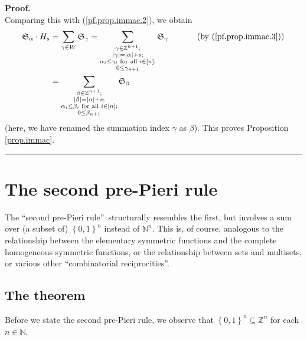 \documentclass[numbers=enddot,12pt,final,onecolumn,notitlepage,english]{scrartcl}%
\theoremstyle{definition}
\newenvironment{proof}[1][Proof]{\noindent\textbf{#1.} }{\ \rule{0.5em}{0.5em}}
\let\sumnonlimits\sum
\renewcommand{\sum}{\sumnonlimits\limits}
\newenvironment{verlong}{}{}
\begin{document}
\begin{proof}
\begin{verlong}
\[\]
Comparing this with (\ref{pf.prop.immac.2}), we obtain%
\begin{align*}
\mathfrak{S}_{\alpha}\cdot H_{s}  &  =\sum_{\gamma\in W}\mathfrak{S}_{\gamma
}=\sum_{\substack{\gamma\in\mathbb{Z}^{n+1};\\\left\vert \gamma\right\vert
=\left\vert \alpha\right\vert +s;\\\alpha_{i}\leq\gamma_{i}\text{ for all
}i\in\left[  n\right]  ;\\0\leq\gamma_{n+1}}}\mathfrak{S}_{\gamma
}\ \ \ \ \ \ \ \ \ \ \left(  \text{by (\ref{pf.prop.immac.3})}\right) \\
&  =\sum_{\substack{\beta\in\mathbb{Z}^{n+1};\\\left\vert \beta\right\vert
=\left\vert \alpha\right\vert +s;\\\alpha_{i}\leq\beta_{i}\text{ for all }%
i\in\left[  n\right]  ;\\0\leq\beta_{n+1}}}\mathfrak{S}_{\beta}%
\end{align*}
(here, we have renamed the summation index $\gamma$ as $\beta$). This proves
Proposition \ref{prop.immac}.
\end{verlong}
\end{proof}

\section{The second pre-Pieri rule}

The \textquotedblleft second pre-Pieri rule\textquotedblright\ structurally
resembles the first, but involves a sum over (a subset of) $\left\{
0,1\right\}  ^{n}$ instead of $\mathbb{N}^{n}$. This is, of course, analogous
to the relationship between the elementary symmetric functions and the
complete homogeneous symmetric functions, or the relationship between sets and
multisets, or various other \textquotedblleft combinatorial
reciprocities\textquotedblright.

\subsection{The theorem}

Before we state the second pre-Pieri rule, we observe that $\left\{
0,1\right\}  ^{n}\subseteq\mathbb{Z}^{n}$ for each $n\in\mathbb{N}$.
\end{document}
